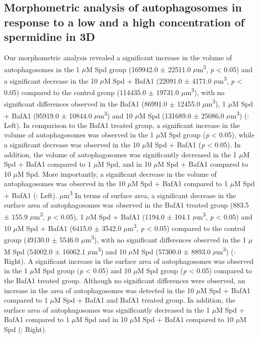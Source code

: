 \subsection{Morphometric analysis of autophagosomes in response to a low and a high concentration of spermidine in 3D}
Our morphometric analysis revealed a significant increase in the volume of autophagosomes in the 1 $\mu$M Spd group (169942.0 $\pm$ 22511.0 $\mu$m\textsuperscript{3}, \textit{p} < 0.05) and a significant decrease in the 10 $\mu$M Spd + BafA1 (22091.0 $\pm$ 4171.0 $\mu$m\textsuperscript{3}, \textit{p} < 0.05) compared to the control group (114435.0 $\pm$ 19731.0 $\mu$m\textsuperscript{3}), with no significant differences observed in the BafA1 (86991.0 $\pm$ 12455.0 $\mu$m\textsuperscript{3}), 1 $\mu$M Spd + BafA1 (95919.0 $\pm$ 10844.0 $\mu$m\textsuperscript{3}) and 10 $\mu$M Spd (131689.0 $\pm$ 25086.0 $\mu$m\textsuperscript{3}) (: Left). In comparison to the BafA1 treated group, a significant increase in the volume of autophagosomes was observed in the 1 $\mu$M Spd group (\textit{p} < 0.05), while a significant decrease was observed in the 10 $\mu$M Spd + BafA1 (\textit{p} < 0.05). In addition, the volume of autophagosomes was significantly decreased in the 1 $\mu$M Spd + BafA1 compared to 1 $\mu$M Spd, and in 10 $\mu$M Spd + BafA1 compared to 10 $\mu$M Spd. More importantly, a significant decrease in the volume of autophagosomes was observed in the 10 $\mu$M Spd + BafA1 compared to 1 $\mu$M Spd + BafA1 (: Left). 
$\mu$m\textsuperscript{3}
In terms of surface area, a significant decrease in the surface area of autophagosomes was observed in the BafA1 treated group (883.5 $\pm$ 155.9 $\mu$m\textsuperscript{3}, \textit{p} < 0.05), 1 $\mu$M Spd + BafA1 (1194.0 $\pm$ 104.1 $\mu$m\textsuperscript{3}, \textit{p} < 0.05) and 10 $\mu$M Spd + BafA1 (6415.0 $\pm$ 3542.0 $\mu$m\textsuperscript{3}, \textit{p} < 0.05) compared to the control group (49130.0 $\pm$ 5546.0 $\mu$m\textsuperscript{3}), with no significant differences observed in the 1 $\mu$M Spd (54002.0 $\pm$ 16062.1 $\mu$m\textsuperscript{3}) and 10 $\mu$M Spd (57300.0 $\pm$ 8893.0 $\mu$m\textsuperscript{3}) (: Right). A significant increase in the surface area of autophagosomes was observed in the 1 $\mu$M Spd group (\textit{p} < 0.05) and 10 $\mu$M Spd group (\textit{p} < 0.05) compared to the BafA1 treated group. Although no significant differences were observed, an increase in the area of autophagosomes was detected in the 10 $\mu$M Spd + BafA1 compared to 1 $\mu$M Spd + BafA1 and BafA1 treated group. In addition, the surface area of autophagosomes was significantly decreased in the 1 $\mu$M Spd + BafA1 compared to 1 $\mu$M Spd and in 10 $\mu$M Spd + BafA1 compared to 10 $\mu$M Spd (: Right). 


